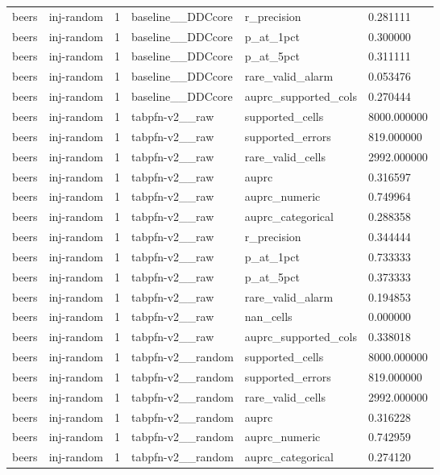 \begin{tabular}{llllll}
beers & inj-random & 1 & baseline\_\_DDCcore & r\_precision & 0.281111 \\
beers & inj-random & 1 & baseline\_\_DDCcore & p\_at\_1pct & 0.300000 \\
beers & inj-random & 1 & baseline\_\_DDCcore & p\_at\_5pct & 0.311111 \\
beers & inj-random & 1 & baseline\_\_DDCcore & rare\_valid\_alarm & 0.053476 \\
beers & inj-random & 1 & baseline\_\_DDCcore & auprc\_supported\_cols & 0.270444 \\
beers & inj-random & 1 & tabpfn-v2\_\_raw & supported\_cells & 8000.000000 \\
beers & inj-random & 1 & tabpfn-v2\_\_raw & supported\_errors & 819.000000 \\
beers & inj-random & 1 & tabpfn-v2\_\_raw & rare\_valid\_cells & 2992.000000 \\
beers & inj-random & 1 & tabpfn-v2\_\_raw & auprc & 0.316597 \\
beers & inj-random & 1 & tabpfn-v2\_\_raw & auprc\_numeric & 0.749964 \\
beers & inj-random & 1 & tabpfn-v2\_\_raw & auprc\_categorical & 0.288358 \\
beers & inj-random & 1 & tabpfn-v2\_\_raw & r\_precision & 0.344444 \\
beers & inj-random & 1 & tabpfn-v2\_\_raw & p\_at\_1pct & 0.733333 \\
beers & inj-random & 1 & tabpfn-v2\_\_raw & p\_at\_5pct & 0.373333 \\
beers & inj-random & 1 & tabpfn-v2\_\_raw & rare\_valid\_alarm & 0.194853 \\
beers & inj-random & 1 & tabpfn-v2\_\_raw & nan\_cells & 0.000000 \\
beers & inj-random & 1 & tabpfn-v2\_\_raw & auprc\_supported\_cols & 0.338018 \\
beers & inj-random & 1 & tabpfn-v2\_\_random & supported\_cells & 8000.000000 \\
beers & inj-random & 1 & tabpfn-v2\_\_random & supported\_errors & 819.000000 \\
beers & inj-random & 1 & tabpfn-v2\_\_random & rare\_valid\_cells & 2992.000000 \\
beers & inj-random & 1 & tabpfn-v2\_\_random & auprc & 0.316228 \\
beers & inj-random & 1 & tabpfn-v2\_\_random & auprc\_numeric & 0.742959 \\
beers & inj-random & 1 & tabpfn-v2\_\_random & auprc\_categorical & 0.274120 \\

\end{tabular}
